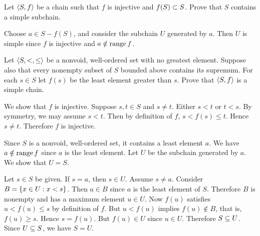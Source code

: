 \begin{exercise}
Let $\left\langle S,f\right\rangle$ be a chain such that $f$ is injective and $f(S) \subset S$. Prove that $S$ contains a
simple subchain.
\end{exercise}

\begin{solution}
Choose $a\in S-f(S)$, and consider the subchain $U$ generated by $a$.
Then $U$ is simple since $f$ is injective and $a\notin\operatorname{range} f$.
\end{solution}

\begin{exercise}
Let $\left\langle S,<,\leq\right\rangle$ be a nonvoid, well-ordered set with no greatest element. Suppose also
that every nonempty subset of $S$ bounded above contains its supremum. For each $s\in S$
let $f(s)$ be the least element greater than $s$. Prove that $\left\langle S,f\right\rangle$ is a simple chain.
\end{exercise}

\begin{solution}
We show that $f$ is injective. Suppose $s,t\in S$ and $s\neq t$. Either $s<t$ or $t<s$.
By symmetry, we may assume $s<t$. Then by definition of $f$, $s<f(s)\leq t$. Hence $s\neq t$.
Therefore $f$ is injective.

Since $S$ is a nonvoid, well-ordered set, it contains a least element $a$. We have $a\notin\operatorname{range} f$
since $a$ is the least element.
Let $U$ be the subchain generated by $a$.
We show that $U=S$.

Let $s\in S$ be given. 
If $s=a$, then $s\in U$. Assume $s\neq a$.
Consider $B=\left\{ x\in U : x < s \right\}$.
Then $a\in B$ since $a$ is the least element of $S$.
Therefore $B$ is nonempty and has a maximum element $u\in U$.
Now $f(u)$ satisfies $u< f(u) \leq s$ by definition of $f$.
But $u<f(u)$ implies $f(u)\nin B$, that is, $f(u) \geq s$.
Hence $s=f(u)$. But $f(u)\in U$ since $u\in U$.
Therefore $S\subseteq U$. Since $U\subseteq S$, we have $S=U$.
\end{solution}
